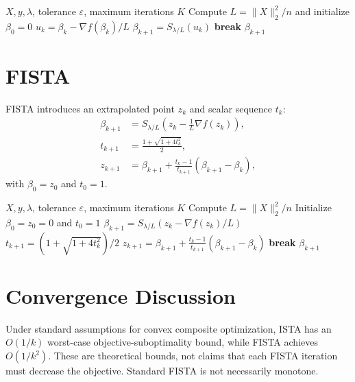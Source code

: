 \documentclass[11pt]{article}
\begin{document}
\begin{algorithm}[H]
\caption{ISTA for Lasso}
\begin{algorithmic}[1]
\Require $X,y,\lambda$, tolerance $\varepsilon$, maximum iterations $K$
\State Compute $L=\|X\|_2^2/n$ and initialize $\beta_0=0$
  \State $u_k=\beta_k-\nabla f(\beta_k)/L$
  \State $\beta_{k+1}=S_{\lambda/L}(u_k)$
    \State \textbf{break}
  \EndIf
\EndFor
\State \Return $\beta_{k+1}$
\end{algorithmic}
\end{algorithm}

\section{FISTA}
FISTA introduces an extrapolated point $z_k$ and scalar sequence $t_k$:
\begin{align}
\beta_{k+1}&=S_{\lambda/L}\left(z_k-\frac{1}{L}\nabla f(z_k)\right),\\
t_{k+1}&=\frac{1+\sqrt{1+4t_k^2}}{2},\\
z_{k+1}&=\beta_{k+1}+
\frac{t_k-1}{t_{k+1}}(\beta_{k+1}-\beta_k),
\end{align}
with $\beta_0=z_0$ and $t_0=1$.

\begin{algorithm}[H]
\caption{FISTA for Lasso}
\begin{algorithmic}[1]
\Require $X,y,\lambda$, tolerance $\varepsilon$, maximum iterations $K$
\State Compute $L=\|X\|_2^2/n$
\State Initialize $\beta_0=z_0=0$ and $t_0=1$
  \State $\beta_{k+1}=S_{\lambda/L}(z_k-\nabla f(z_k)/L)$
  \State $t_{k+1}=(1+\sqrt{1+4t_k^2})/2$
  \State $z_{k+1}=\beta_{k+1}+\frac{t_k-1}{t_{k+1}}(\beta_{k+1}-\beta_k)$
    \State \textbf{break}
  \EndIf
\EndFor
\State \Return $\beta_{k+1}$
\end{algorithmic}
\end{algorithm}

\section{Convergence Discussion}
Under standard assumptions for convex composite optimization, ISTA has an
$O(1/k)$ worst-case objective-suboptimality bound, while FISTA achieves
$O(1/k^2)$. These are theoretical bounds, not claims that each FISTA iteration
must decrease the objective. Standard FISTA is not necessarily monotone.
\end{document}
